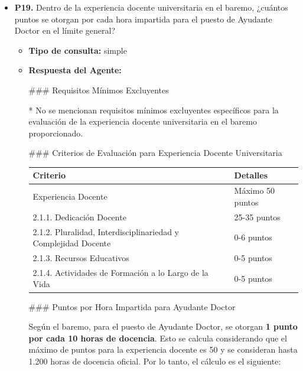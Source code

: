 \documentclass{article}
\begin{document}
\begin{itemize}
  \item \textbf{P19.} Dentro de la experiencia docente universitaria en el baremo, ¿cuántos puntos se otorgan por cada hora impartida para el puesto de Ayudante Doctor en el límite general? \\
        \begin{itemize}
          \item \textbf{Tipo de consulta:} simple
          \item \textbf{Respuesta del Agente:}

                \#\#\# Requisitos Mínimos Excluyentes

                * No se mencionan requisitos mínimos excluyentes específicos para la evaluación de la experiencia docente universitaria en el baremo proporcionado.

                \#\#\# Criterios de Evaluación para Experiencia Docente Universitaria

                \vspace{0.4cm}
                \begin{table}[h!]\centering\renewcommand{\arraystretch}{1.3}
                  \begin{tabular}{|p{}|p{}|}\hline
                    Criterio                                                       & Detalles         \\\hline
                    Experiencia Docente                                            & Máximo 50 puntos \\\hline
                    2.1.1. Dedicación Docente                                      & 25-35 puntos     \\\hline
                    2.1.2. Pluralidad, Interdisciplinariedad y Complejidad Docente & 0-6 puntos       \\\hline
                    2.1.3. Recursos Educativos                                     & 0-5 puntos       \\\hline
                    2.1.4. Actividades de Formación a lo Largo de la Vida          & 0-5 puntos       \\\hline
                  \end{tabular}\end{table}
                \vspace{0.4cm}

                \#\#\# Puntos por Hora Impartida para Ayudante Doctor

                Según el baremo, para el puesto de Ayudante Doctor, se otorgan \textbf{1 punto por cada 10 horas de docencia}. Esto se calcula considerando que el máximo de puntos para la experiencia docente es 50 y se consideran hasta 1.200 horas de docencia oficial. Por lo tanto, el cálculo es el siguiente:


\end{itemize}
\end{itemize}
\end{document}
